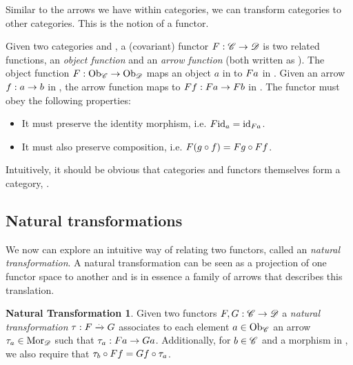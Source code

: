 Similar to the arrows we have within categories, we can transform categories to other categories. This is the notion of a functor.
\begin{covfunctordef}
  Given two categories  and , a (covariant) functor $\mathnormal{F}:
  \mathscr{C} \to \mathscr{D}$ is two related functions, an \emph{object function} and
  an \emph{arrow function} (both written as ). The object function
  $\mathnormal{F}: \mathrm{Ob}_{\mathscr{C}} \to \mathrm{Ob}_{\mathscr{D}}$ maps an object $a$ in  to
  $\mathnormal{F} \mathnormal{a}$ in . Given an arrow $\mathnormal{f}: \mathnormal{a} \to
  \mathnormal{b}$ in , the arrow function maps  to
  $\mathnormal{F} \mathnormal{f}: \mathnormal{F} \mathnormal{a} \to \mathnormal{F} \mathnormal{b}$ in . The functor must obey the following properties:
  \begin{itemize}
    \item It must preserve the identity morphism, i.e. $\mathnormal{F} \mathnormal{\mathrm{id}_{\mathnormal{a}}} = \mathrm{id}_{\mathnormal{\mathnormal{F} \mathnormal{a}}}$.
    \item It must also preserve composition, i.e.
        $\mathnormal{F} \mathnormal{\left(\mathnormal{g} \circ \mathnormal{f}\right)} = \mathnormal{F} \mathnormal{\mathnormal{g}} \circ \mathnormal{F} \mathnormal{\mathnormal{f}}$.
  \end{itemize}
\end{covfunctordef}

Intuitively, it should be obvious that categories and functors themselves form a category, .\\

\subsection{Natural transformations}
\theoremstyle{definition}\newtheorem*{nattransdef}{Natural Transformation}
We now can explore an intuitive way of relating two functors, called an \emph{natural transformation}. A natural transformation can be seen as a projection of one functor space to another and is in essence a family of arrows that describes this translation.
\begin{nattransdef}
Given two functors $\mathnormal{F}, \mathnormal{G} : \mathscr{C} \to \mathscr{D}$ a
\emph{natural transformation} $\tau: \mathnormal{F} \xrightarrow{.} \mathnormal{G}$ associates to each element $\mathnormal{a} \in \mathrm{Ob}_{\mathscr{C}}$ an arrow $\tau_{a} \in \mathrm{Mor}_{\mathscr{D}}$ such that $\tau_{a}: \mathnormal{F} \mathnormal{a} \to \mathnormal{G} \mathnormal{a}$. Additionally, for $\mathnormal{b} \in \mathscr{C}$ and  a morphism in , we also require that $\tau_{b} \circ \mathnormal{F} \mathnormal{f} = \mathnormal{G} \mathnormal{f} \circ \tau_{a}$.

\end{nattransdef}

